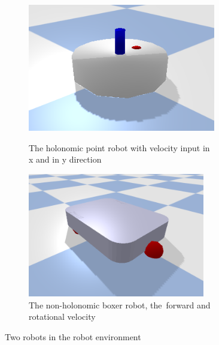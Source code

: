 \begin{figure}[H]
    \centering
    \begin{subfigure}{.5\textwidth}
    \centering
    \includegraphics[width=0.9\textwidth]{figures/introduction/point_robot.png}
    \caption{The holonomic point robot with velocity input in \\\gls{x} and in \gls{y} direction}%
    \label{subfig:example_point_robot}
    \end{subfigure}%
    \begin{subfigure}{.5\textwidth}
    \centering
    \includegraphics[width=0.85\textwidth]{figures/introduction/boxer_robot.png}
    \caption{The non-holonomic boxer robot, the\ forward and rotational velocity}%
    \label{subfig:example_boxer_robot}
    \end{subfigure}%
    \caption{Two robots in the robot environment}%
    \label{fig:example_robots}
\end{figure}


